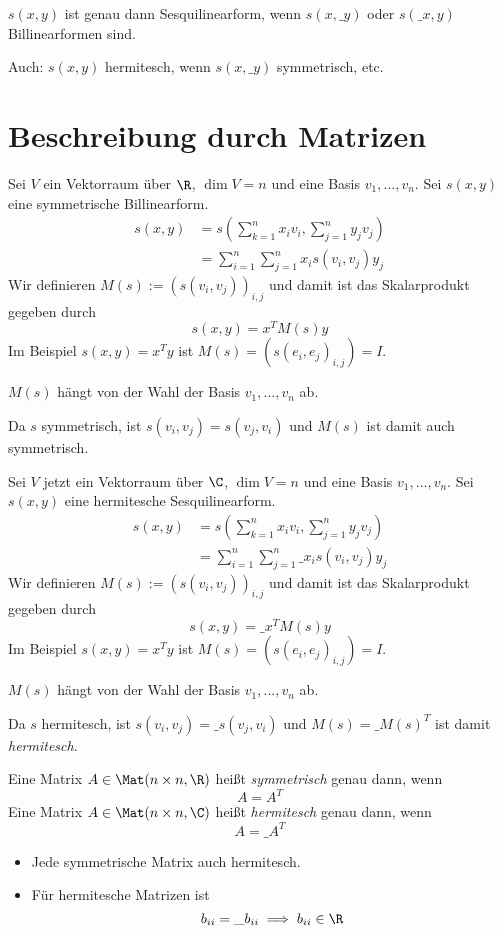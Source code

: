 \documentclass{mycourse}
\begin{document}
\begin{note}
	$s(x,y)$ ist genau dann Sesquilinearform, wenn $s(x,\_y)$ oder $s(\_x,y)$ Billinearformen sind.

	Auch: $s(x,y)$ hermitesch, wenn $s(x,\_y)$ symmetrisch, etc.
\end{note}


\section{Beschreibung durch Matrizen}


Sei $V$ ein Vektorraum über $\R$, $\dim V=n$ und eine Basis $v_1,\dotsc, v_n$.
Sei $s(x,y)$ eine symmetrische Billinearform.
\begin{align*}
	s(x,y) &= s\left(\sum_{k=1}^nx_iv_i, \sum_{j=1}^ny_jv_j\right) \\
					   &= \sum_{i=1}^n\sum_{j=1}^n x_i s(v_i,v_j) y_j
\end{align*}
Wir definieren $M(s) := (s(v_i,v_j))_{i,j}$ und damit ist das Skalarprodukt gegeben durch
\[
	s(x,y) = x^T M(s) y
\]
Im Beispiel $s(x,y) = x^Ty$ ist $M(s) = (s(e_i,e_j)_{i,j}) = I$.

$M(s)$ hängt von der Wahl der Basis $v_1,\dotsc, v_n$ ab.

Da $s$ symmetrisch, ist $s(v_i,v_j) = s(v_j,v_i)$ und $M(s)$ ist damit auch symmetrisch.


Sei $V$ jetzt ein Vektorraum über $\C$, $\dim V=n$ und eine Basis $v_1,\dotsc, v_n$.
Sei $s(x,y)$ eine hermitesche Sesquilinearform.
\begin{align*}
	s(x,y) &= s(\sum_{k=1}^nx_iv_i, \sum_{j=1}^ny_jv_j) \\
					   &= \sum_{i=1}^n\sum_{j=1}^n \_{x_i} s(v_i,v_j) y_j
\end{align*}
Wir definieren $M(s) := (s(v_i,v_j))_{i,j}$ und damit ist das Skalarprodukt gegeben durch
\[
	s(x,y) = \_x^T M(s) y
\]
Im Beispiel $s(x,y) = x^Ty$ ist $M(s) = (s(e_i,e_j)_{i,j}) = I$.

$M(s)$ hängt von der Wahl der Basis $v_1,\dotsc, v_n$ ab.

Da $s$ hermitesch, ist $s(v_i,v_j) = \_{s(v_j,v_i)}$ und $M(s) = \_{M(s)}^T$ ist damit \emph{hermitesch}.


\begin{df}
	\label{df:13.3}
	Eine Matrix $A\in \Mat(n\times n,\R)$ heißt \emph{symmetrisch} genau dann, wenn
	\[
		A = A^T
	\]
	Eine Matrix $A\in \Mat(n\times n,\C)$ heißt \emph{hermitesch} genau dann, wenn
	\[
		A = \_A^T
	\]
	\begin{note}
		\begin{itemize}
			\item
				Jede symmetrische Matrix auch hermitesch.
			\item
				Für hermitesche Matrizen ist
				\[
					b_{ii} = \_{b_{ii}} \implies b_{ii} \in \R
				\]
		\end{itemize}
	\end{note}
\end{df}
\end{document}
